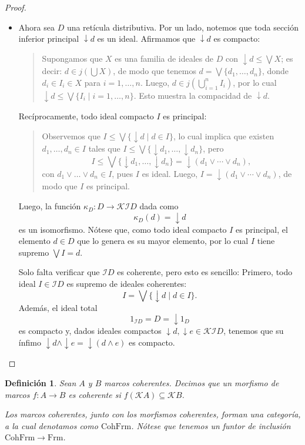 \documentclass[12pt,letterpaper,titlepage]{article}
\newtheorem*{defn}{Definición}
\theoremstyle{definition}
\renewcommand\sup{\vee}
\newcommand\Sup{\bigvee}
\newcommand\down{{\downarrow}}
\renewcommand\inf{\wedge}
\renewcommand\cal[1]{\mathcal{#1}}
\newcommand\<{\langle}
\renewcommand\>{\rangle}
\newcommand{\Frm}{\mathrm{Frm}}
\newcommand{\CohFrm}{\mathrm{CohFrm}}
\begin{document}
\begin{proof}
\begin{itemize}
        \item
        Ahora sea $D$ una retícula distributiva.
        Por un lado, notemos que toda sección inferior
        principal $\down d$ es un ideal.
        Afirmamos que $\down d$ es compacto:
        \begin{quote}
            Supongamos que $X$ es una familia de ideales de $D$
            con $\down d\leq \Sup X$; es decir: $d\in j(\bigcup X)$,
            de modo que tenemos $d=\Sup\{d_1,\dots,d_n\}$,
            donde $d_i\in I_i\in X$ para $i=1,\dots,n$.
            Luego, $d\in j(\bigcup_{i=1}^n I_i)$,
            por lo cual $\down d\leq\Sup\{I_i\mid i=1,\dots,n\}$.
            Esto muestra la compacidad de $\down d$.
        \end{quote}
        Recíprocamente, todo ideal compacto $I$ es principal:
        \begin{quote}
            Observemos que $I\leq\Sup\{\down d\mid d\in I\}$,
            lo cual implica que existen $d_1,\dots,d_n\in I$
            tales que $I\leq\Sup\{\down d_1,\dots,\down d_n\}$,
            pero
            \[
                I
                \leq \Sup\{\down d_1,\dots,\down d_n\}
                = \down(d_1\sup\cdots\sup d_n),
            \]
            con $d_1\sup\dots\sup d_n\in I$, pues $I$ es ideal.
            Luego, $I=\down(d_1\sup\cdots\sup d_n)$,
            de modo que $I$ es principal.
       \end{quote} 
        Luego, la función $\kappa_D:D\to\cal K\cal ID$ dada como
        \[
            \kappa_D(d) = \down d
        \]
        es un isomorfismo.
        Nótese que, como todo ideal compacto $I$ es principal,
        el elemento $d\in D$ que lo genera es su mayor elemento,
        por lo cual $I$ tiene supremo $\Sup I=d$.
        
        Solo falta verificar que $\cal ID$ es coherente,
        pero esto es sencillo:
        Primero, todo ideal $I\in\cal ID$ es supremo
        de ideales coherentes:
        \[
            I = \Sup\{\down d\mid d\in I\}.
        \]
        Además, el ideal total
        \[
            1_{\cal ID}=D=\down 1_D
        \]
        es compacto y, dados ideales compactos
        $\down d,\down e\in\cal K\cal ID$, tenemos que su ínfimo
        $\down d\inf\down e=\down(d\inf e)$ es compacto.
    \end{itemize}
\end{proof}

\begin{defn}
    Sean $A$ y $B$ marcos coherentes.
    Decimos que un morfismo de marcos $f:A\to B$ es coherente
    si $f(\cal KA)\subseteq\cal KB$.
    
    Los marcos coherentes, junto con los morfismos coherentes,
    forman una categoría, a la cual denotamos como $\CohFrm$.
    Nótese que tenemos un funtor de inclusión $\CohFrm\to\Frm$.
\end{defn}
\end{document}
